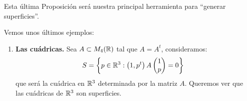 \noindent
Esta última Proposición será nuestra principal herramienta para ``generar superficies''.

\begin{ejemplo}
    Vemos unos últimos ejemplos:
    \begin{enumerate}
        \item[7.] \textbf{Las cuádricas.} Sea $A\subset M_4(\mathbb{R})$ tal que $A=A^t$, consideramos:
        \begin{gather*}
            S = \left\{p\in \mathbb{R}^3 : \left(1,p^t\right)A \begin{pmatrix} 1\\p\end{pmatrix} = 0\right\} 
        \end{gather*}
        que será la cuádrica en $\mathbb{R}^3$ determinada por la matriz $A$. Queremos ver que las cuádricas de $\mathbb{R}^3$ son superficies.\\


\end{enumerate}
\end{ejemplo}
